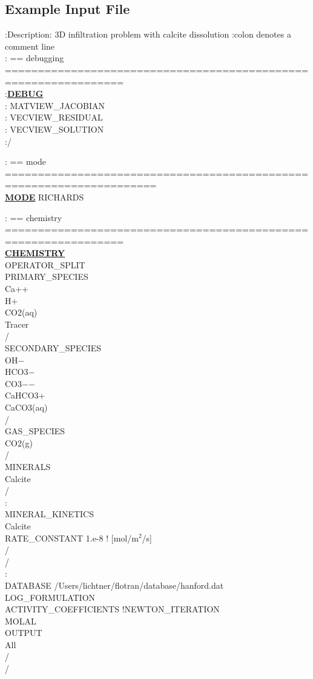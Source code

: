 \clearpage

\subsection{Example Input File}\label{exinput}

\hypertarget{target_input_file}{}

\footnotesize
:Description: 3D infiltration problem with calcite dissolution
:colon denotes a comment line\\

\noindent
: == debugging ================================================================\\
:\hyperlink{target_dbg}{\bf DEBUG}\\
:  MATVIEW\_JACOBIAN\\
:  VECVIEW\_RESIDUAL\\
:  VECVIEW\_SOLUTION\\
:/

\noindent
: == mode =====================================================================\\
\hyperlink{target_mode}{\bf MODE} RICHARDS

\noindent
: == chemistry ================================================================\\
\hyperlink{target_chem}{\bf CHEMISTRY}\\
OPERATOR\_SPLIT\\
PRIMARY\_SPECIES\\
  Ca++\\
  H+\\
  CO2(aq)\\
  Tracer\\
/\\
SECONDARY\_SPECIES\\
  OH$-$\\
  HCO3$-$\\
  CO3$-$$-$\\
  CaHCO3+\\
  CaCO3(aq)\\
/\\
GAS\_SPECIES\\
  CO2(g)\\
/\\
MINERALS\\
  Calcite\\
/\\
:\\
MINERAL\_KINETICS\\
Calcite\\
RATE\_CONSTANT 1.e-8 ! [mol/m$^2$/s]\\
/\\
/\\
:\\
DATABASE /Users/lichtner/flotran/database/hanford.dat\\
LOG\_FORMULATION\\
ACTIVITY\_COEFFICIENTS !NEWTON\_ITERATION\\
MOLAL\\
OUTPUT\\
All\\
/\\
/

